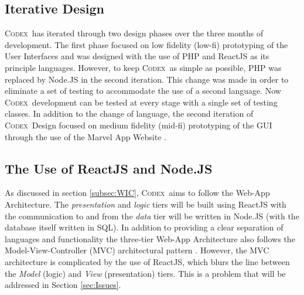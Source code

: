 \documentclass[progress]{cmpreport}
\newcommand{\Codex}{\textsc{Codex}}
\begin{document}
		\subsection{Iterative Design}
		\Codex \ has iterated through two design phases over the three months of development. The first phase focused on low fidelity (low-fi) prototyping of the User Interfaces and was designed with the use of PHP and ReactJS as its principle languages. However, to keep \Codex \ as simple as possible, PHP was replaced by Node.JS in the second iteration. This change was made in order to eliminate a set of testing to accommodate the use of a second language. Now \Codex \ development can be tested at every stage with a single set of testing classes. In addition to the change of language, the second iteration of \Codex \ Design focused on medium fidelity (mid-fi) prototyping of the GUI through the use of the Marvel App Website \citep{marvelapp}.
	
		\subsection{The Use of ReactJS and Node.JS}
		As discussed in section \ref{subsec:WIC}, \Codex \ aims to follow the Web-App Architecture. The \emph{presentation} and \emph{logic} tiers will be built using ReactJS with the communication to and from the \emph{data} tier will be written in Node.JS (with the database itself written in SQL). In addition to providing a clear separation of languages and functionality the three-tier Web-App Architecture also follows the Model-View-Controller (MVC) architectural pattern \citep{ModelViewController}. However, the MVC architecture is complicated by the use of ReactJS, which blurs the line between the \emph{Model} (logic) and \emph{View} (presentation) tiers. This is a problem that will be addressed in Section \ref{sec:Issues}.
		
\end{document}
